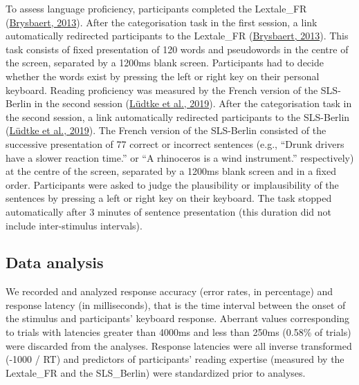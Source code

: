 \documentclass[
  a4paper,12pt,twoside,onecolumn,openright,final,oldfontcommands]{memoir}
\begin{document}
To assess language proficiency, participants completed the Lextale\_FR (\protect\hyperlink{ref-brysbaert_lextale_fr_2013}{Brysbaert, 2013}). After the categorisation task in the first session, a link automatically redirected participants to the Lextale\_FR (\protect\hyperlink{ref-brysbaert_lextale_fr_2013}{Brysbaert, 2013}). This task consists of fixed presentation of 120 words and pseudowords in the centre of the screen, separated by a 1200ms blank screen. Participants had to decide whether the words exist by pressing the left or right key on their personal keyboard. Reading proficiency was measured by the French version of the SLS-Berlin in the second session (\protect\hyperlink{ref-ludtke_sls-berlin_2019}{Lüdtke et al., 2019}). After the categorisation task in the second session, a link automatically redirected participants to the SLS-Berlin (\protect\hyperlink{ref-ludtke_sls-berlin_2019}{Lüdtke et al., 2019}). The French version of the SLS-Berlin consisted of the successive presentation of 77 correct or incorrect sentences (e.g., ``Drunk drivers have a slower reaction time.'' or ``A rhinoceros is a wind instrument.'' respectively) at the centre of the screen, separated by a 1200ms blank screen and in a fixed order. Participants were asked to judge the plausibility or implausibility of the sentences by pressing a left or right key on their keyboard. The task stopped automatically after 3 minutes of sentence presentation (this duration did not include inter-stimulus intervals).

\hypertarget{data-analysis}{%
\subsection{Data analysis}\label{data-analysis}}

We recorded and analyzed response accuracy (error rates, in percentage) and response latency (in milliseconds), that is the time interval between the onset of the stimulus and participants' keyboard response. Aberrant values corresponding to trials with latencies greater than 4000ms and less than 250ms (0.58\% of trials) were discarded from the analyses. Response latencies were all inverse transformed (-1000 / RT) and predictors of participants' reading expertise (measured by the Lextale\_FR and the SLS\_Berlin) were standardized prior to analyses.
\end{document}

